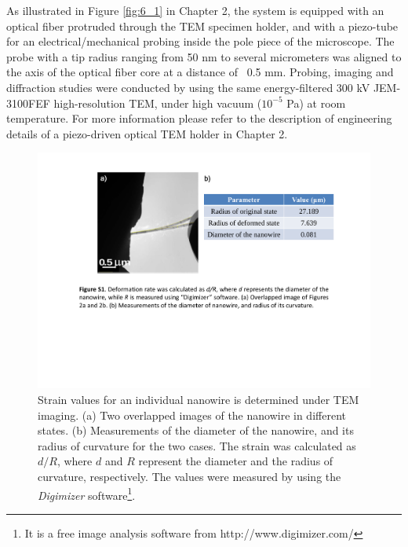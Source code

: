 As illustrated in Figure \ref{fig:6_1} in Chapter 2, the system is equipped with an optical fiber protruded through the TEM specimen holder, and with a piezo-tube for an electrical/mechanical probing inside the pole piece of the microscope. 
The probe with a tip radius ranging from 50 nm to several micrometers was aligned to the axis of the optical fiber core at a distance of ~0.5 mm. 
Probing, imaging and diffraction studies were conducted by using the same energy-filtered 300 kV JEM-3100FEF high-resolution TEM, under high vacuum ($10^{-5}$ Pa) at room temperature. 
For more information please refer to the description of engineering details of a piezo-driven optical TEM holder in Chapter 2.\\

\begin{figure}  
\includegraphics[height=\textwidth,angle=-90]{figures/figure6_s2}
\caption[Strain value]
{Strain values for an individual nanowire is determined under TEM imaging. 
(a) Two overlapped images of the nanowire in different states. 
(b) Measurements of the diameter of the nanowire, and its radius of curvature for the two cases. The strain was calculated as $d/R$, where $d$ and $R$ represent the diameter and the radius of curvature, respectively. The values were measured by using the {\em Digimizer} software\footnote{It is a free image analysis software from http://www.digimizer.com/}.
\label{fig:6_s2}}
\end{figure}


